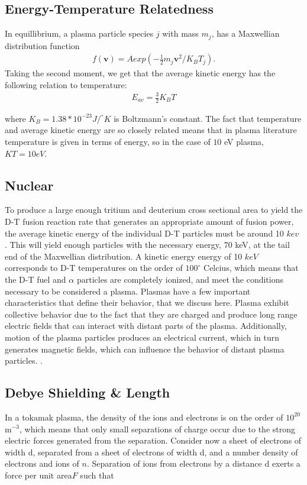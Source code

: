 \documentclass{article}
\begin{document}
\subsection{Energy-Temperature Relatedness}


In equillibrium, a plasma particle species $j$ with mass $m_j$, has a  Maxwellian distribution function
\begin{align*}
f(\textbf{v}) = Aexp(-\frac{1}{2}m_j \textbf{v}^2/K_BT_j). 
\end{align*}
Taking the second moment, we get that the average kinetic energy has the following relation to temperature:
\begin{align*}
E_{av} = \frac{3}{2} K_BT
\end{align*}

where $K_B=1.38*10^{-23}J/^{\circ}K$ is Boltzmann's constant. The fact that temperature and average kinetic energy are so closely related means that in plasma literature temperature is given in terms of energy, so in the case of $10$ eV plasma, $KT =10eV$.\\
\subsection{Nuclear}
To produce a large enough tritium and deuterium cross sectional area to yield the D-T fusion reaction rate that generates an appropriate amount of fusion power, the average kinetic energy of the individual D-T particles must be around 10 $kev$ \cite{Wesson}. This will yield enough particles with the necessary energy, $70$ keV, \cite{Chen} at the tail end of the Maxwellian distribution.  
A kinetic energy energy of 10 $keV$ corresponds to D-T temperatures on the order of $100^{\circ}$ Celcius, which means that the D-T fuel and $\alpha$ particles are completely ionized, and meet the conditions necessary to be considered a plasma.
Plasmas have a few important characteristics that define their behavior, that we discuss here. Plasma exhibit collective behavior due to the fact that they are charged and produce long range electric fields that can interact with distant parts of the plasma. Additionally, motion of the plasma particles produces an electrical current, which in turn generates magnetic fields, which can influence the behavior of distant plasma particles.   \cite{Chen}.


\subsection{Debye Shielding \& Length}
In a tokamak plasma, the density of the ions and electrons is on the order of $10^{20}$m$^{-3}$,  which means that only small separations of charge occur due to the strong electric forces generated from the separation. Consider now a sheet of electrons of width d, separated from a sheet of electrons of width d, and a number density of electrons and ions of $n$. Separation of ions from electrons by a distance d exerts a force per unit area$F$ such that 
\end{document}

